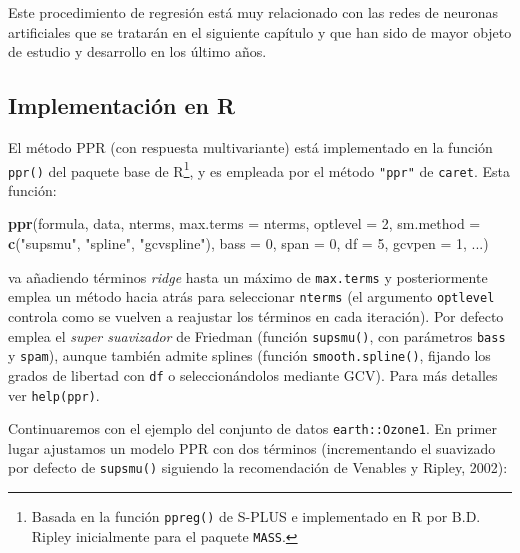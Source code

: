 \documentclass[
]{book}
\newenvironment{Shaded}{\begin{snugshade}}{\end{snugshade}}
\newcommand{\DataTypeTok}[1]{\textcolor[rgb]{0.13,0.29,0.53}{#1}}
\newcommand{\DecValTok}[1]{\textcolor[rgb]{0.00,0.00,0.81}{#1}}
\newcommand{\KeywordTok}[1]{\textcolor[rgb]{0.13,0.29,0.53}{\textbf{#1}}}
\newcommand{\NormalTok}[1]{#1}
\newcommand{\StringTok}[1]{\textcolor[rgb]{0.31,0.60,0.02}{#1}}
\theoremstyle{break}
\theoremstyle{definition}
\theoremstyle{definition}
\theoremstyle{definition}
\theoremstyle{remark}
\begin{document}
Este procedimiento de regresión está muy relacionado con las redes de neuronas artificiales que se tratarán en el siguiente capítulo y que han sido de mayor objeto de estudio y desarrollo en los último años.

\hypertarget{implementaciuxf3n-en-r-1}{%
\subsection{Implementación en R}\label{implementaciuxf3n-en-r-1}}

El método PPR (con respuesta multivariante) está implementado en la función \texttt{ppr()} del paquete base de R\footnote{Basada en la función \texttt{ppreg()} de S-PLUS e implementado en R por B.D. Ripley inicialmente para el paquete \texttt{MASS}.}, y es empleada por el método \texttt{"ppr"} de \texttt{caret}.
Esta función:

\begin{Shaded}
\begin{Highlighting}[]
\KeywordTok{ppr}\NormalTok{(formula, data, nterms, }\DataTypeTok{max.terms =}\NormalTok{ nterms, }\DataTypeTok{optlevel =} \DecValTok{2}\NormalTok{,}
    \DataTypeTok{sm.method =} \KeywordTok{c}\NormalTok{(}\StringTok{"supsmu"}\NormalTok{, }\StringTok{"spline"}\NormalTok{, }\StringTok{"gcvspline"}\NormalTok{),}
    \DataTypeTok{bass =} \DecValTok{0}\NormalTok{, }\DataTypeTok{span =} \DecValTok{0}\NormalTok{, }\DataTypeTok{df =} \DecValTok{5}\NormalTok{, }\DataTypeTok{gcvpen =} \DecValTok{1}\NormalTok{, ...)}
\end{Highlighting}
\end{Shaded}

va añadiendo términos \emph{ridge} hasta un máximo de \texttt{max.terms} y posteriormente emplea un método hacia atrás para seleccionar \texttt{nterms} (el argumento \texttt{optlevel} controla como se vuelven a reajustar los términos en cada iteración).
Por defecto emplea el \emph{super suavizador} de Friedman (función \texttt{supsmu()}, con parámetros \texttt{bass} y \texttt{spam}), aunque también admite splines (función \texttt{smooth.spline()}, fijando los grados de libertad con \texttt{df} o seleccionándolos mediante GCV).
Para más detalles ver \texttt{help(ppr)}.

Continuaremos con el ejemplo del conjunto de datos \texttt{earth::Ozone1}. En primer lugar ajustamos un modelo PPR con dos términos (incrementando el suavizado por defecto de \texttt{supsmu()} siguiendo la recomendación de Venables y Ripley, 2002):
\end{document}
